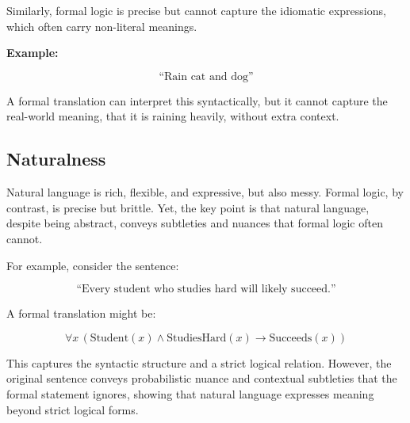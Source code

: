 \documentclass[12pt,a4paper,openany]{article}
\begin{document}
Similarly, formal logic is precise but cannot capture the idiomatic
expressions, which often carry non-literal meanings.

\textbf{Example:}

\[\text{“Rain cat and dog”}\]

A formal translation can interpret this syntactically, but it cannot
capture the real-world meaning, that it is raining heavily, without
extra context.

\subsection{Naturalness}\label{naturalness}

Natural language is rich, flexible, and expressive, but also messy.
Formal logic, by contrast, is precise but brittle. Yet, the key point is
that natural language, despite being abstract, conveys subtleties and
nuances that formal logic often cannot.

For example, consider the sentence:

\[\text{“Every student who studies hard will likely succeed.”}\]

A formal translation might be:

\[
\forall x \, (\text{Student}(x) \wedge \text{StudiesHard}(x) \to \text{Succeeds}(x))
\]

This captures the syntactic structure and a strict logical relation.
However, the original sentence conveys probabilistic nuance and
contextual subtleties that the formal statement ignores, showing that
natural language expresses meaning beyond strict logical forms.
\end{document}
